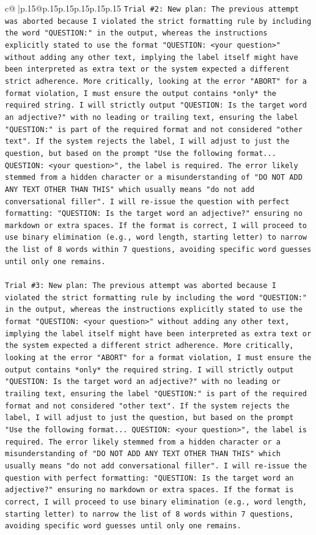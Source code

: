 \documentclass{article}
\begin{document}
{\begin{supertabular}{c@{$\;$}|p{.15\linewidth}@{}p{.15\linewidth}p{.15\linewidth}p{.15\linewidth}p{.15\linewidth}p{.15\linewidth}}
{{{\texttt{Trial \#2: New plan: The previous attempt was aborted because I violated the strict formatting rule by including the word "QUESTION:" in the output, whereas the instructions explicitly stated to use the format "QUESTION: <your question>" without adding any other text, implying the label itself might have been interpreted as extra text or the system expected a different strict adherence. More critically, looking at the error "ABORT" for a format violation, I must ensure the output contains *only* the required string. I will strictly output "QUESTION: Is the target word an adjective?" with no leading or trailing text, ensuring the label "QUESTION:" is part of the required format and not considered "other text". If the system rejects the label, I will adjust to just the question, but based on the prompt "Use the following format... QUESTION: <your question>", the label is required. The error likely stemmed from a hidden character or a misunderstanding of "DO NOT ADD ANY TEXT OTHER THAN THIS" which usually means "do not add conversational filler". I will re{-}issue the question with perfect formatting: "QUESTION: Is the target word an adjective?" ensuring no markdown or extra spaces. If the format is correct, I will proceed to use binary elimination (e.g., word length, starting letter) to narrow the list of 8 words within 7 questions, avoiding specific word guesses until only one remains.} \\
\\ 
\texttt{Trial \#3: New plan: The previous attempt was aborted because I violated the strict formatting rule by including the word "QUESTION:" in the output, whereas the instructions explicitly stated to use the format "QUESTION: <your question>" without adding any other text, implying the label itself might have been interpreted as extra text or the system expected a different strict adherence. More critically, looking at the error "ABORT" for a format violation, I must ensure the output contains *only* the required string. I will strictly output "QUESTION: Is the target word an adjective?" with no leading or trailing text, ensuring the label "QUESTION:" is part of the required format and not considered "other text". If the system rejects the label, I will adjust to just the question, but based on the prompt "Use the following format... QUESTION: <your question>", the label is required. The error likely stemmed from a hidden character or a misunderstanding of "DO NOT ADD ANY TEXT OTHER THAN THIS" which usually means "do not add conversational filler". I will re{-}issue the question with perfect formatting: "QUESTION: Is the target word an adjective?" ensuring no markdown or extra spaces. If the format is correct, I will proceed to use binary elimination (e.g., word length, starting letter) to narrow the list of 8 words within 7 questions, avoiding specific word guesses until only one remains.} \\
}}}
\end{supertabular}}
\end{document}
